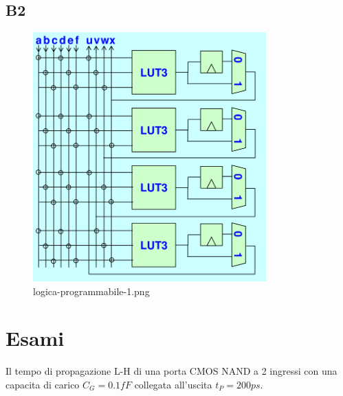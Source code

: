 \documentclass[12pt]{article}
\begin{document}
\begin{problem}{}{}
    
\end{problem}

\subsection{B2}
\begin{problem}{}{}
    \begin{figure}[H]
        \centering
        \includegraphics[width=0.8\textwidth]{logica-programmabile-1.png}
        \caption{logica-programmabile-1.png}
        \label{fig:logica-programmabile-1-png}
    \end{figure}
\end{problem}


\newpage
\section{Esami}

Il tempo di propagazione L-H di una porta CMOS NAND a 2 ingressi con una capacita di carico $C_G = 0.1fF$ collegata all'uscita $t_P = 200ps$. 
\end{document}
